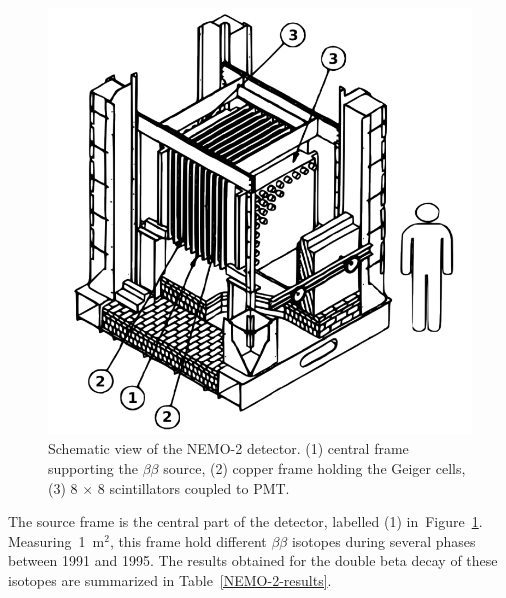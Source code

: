 \documentclass[main.tex]{subfiles}
\begin{document}
\begin{figure}[h!]
\begin{center}
\includegraphics[scale=0.27]{pictures/Chap3/NEMO2.png}
\caption{Schematic view of the NEMO-2 detector. (1) central frame supporting the $\beta\beta$ source, (2) copper frame holding the Geiger cells, (3) 8 $\times$ 8 scintillators coupled to PMT.}
\label{NEMO2}
\end{center}
\end{figure}

\bigskip


\NI The source frame is the central part of the detector, labelled (1) in~Figure~\ref{NEMO2}. Measuring~1~m$^\text{2}$, this frame hold different $\beta\beta$ isotopes during several phases between 1991 and 1995. The results obtained for the double beta decay of these isotopes are summarized in Table~\ref{NEMO-2-results}.
\end{document}
